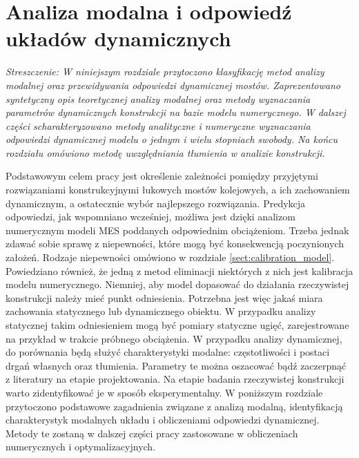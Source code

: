 \chapter{Analiza modalna i odpowiedź układów dynamicznych} \label{sect:modal_analysis_and_response}

\textit{Streszczenie: W niniejszym rozdziale przytoczono klasyfikację metod analizy modalnej oraz przewidywania odpowiedzi dynamicznej mostów. Zaprezentowano syntetyczny opis teoretycznej analizy modalnej oraz metody wyznaczania parametrów dynamicznych konstrukcji na bazie modelu numerycznego. W dalszej części scharakteryzowano metody analityczne i numeryczne wyznaczania odpowiedzi dynamicznej modelu o jednym i wielu stopniach swobody. Na końcu rozdziału omówiono metodę uwzględniania tłumienia w analizie konstrukcji.}

\vspace{1cm}


Podstawowym celem pracy jest określenie zależności pomiędzy przyjętymi rozwiązaniami konstrukcyjnymi łukowych mostów kolejowych, a ich zachowaniem dynamicznym, a ostatecznie wybór najlepszego rozwiązania. Predykcja odpowiedzi, jak wspomniano wcześniej, możliwa jest dzięki analizom numerycznym modeli MES poddanych odpowiednim obciążeniom. Trzeba jednak zdawać sobie sprawę z niepewności, które mogą być konsekwencją poczynionych założeń. Rodzaje niepewności omówiono w rozdziale \ref{sect:calibration_model}. Powiedziano również, że jedną z metod eliminacji niektórych z nich jest kalibracja modelu numerycznego. Niemniej, aby model dopasować do działania rzeczywistej konstrukcji należy mieć punkt odniesienia. Potrzebna jest więc jakaś miara zachowania statycznego lub dynamicznego obiektu. W przypadku analizy statycznej takim odniesieniem mogą być pomiary statyczne ugięć, zarejestrowane na przykład w trakcie próbnego obciążenia. W przypadku analizy dynamicznej, do porównania będą służyć charakterystyki modalne: częstotliwości i postaci drgań własnych oraz tłumienia. Parametry te można oszacować bądź zaczerpnąć z literatury na etapie projektowania. Na etapie badania rzeczywistej konstrukcji warto zidentyfikować je w sposób eksperymentalny. W poniższym rozdziale przytoczono podstawowe zagadnienia związane z analizą modalną, identyfikacją charakterystyk modalnych układu i  obliczeniami odpowiedzi dynamicznej. Metody te zostaną w dalszej części pracy zastosowane w obliczeniach numerycznych i optymalizacyjnych.

